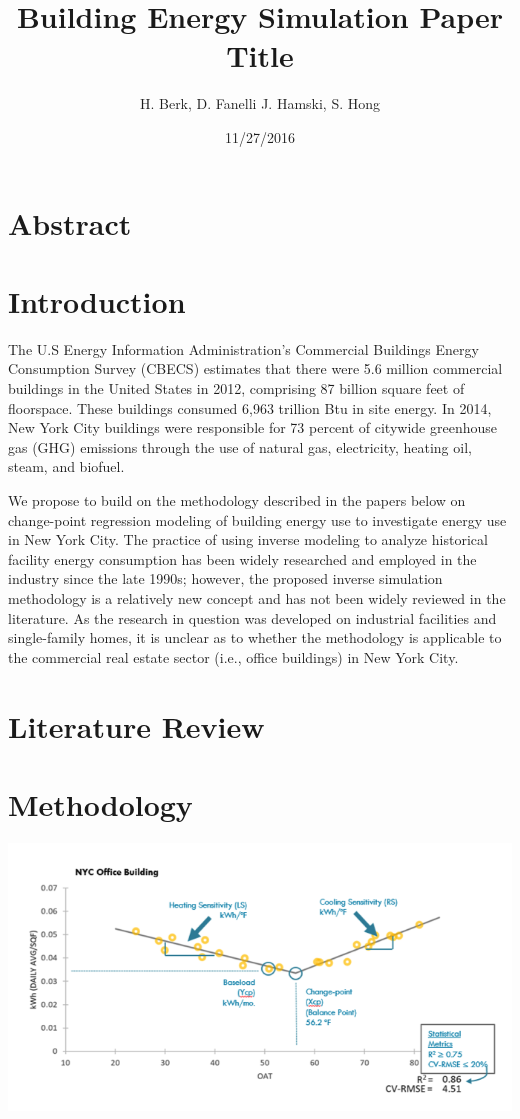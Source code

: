 \documentclass[]{article}
\title{Building Energy Simulation Paper Title}
\author{H. Berk, D. Fanelli J. Hamski, S. Hong}
\date{11/27/2016}
\begin{document}
\maketitle

\section{Abstract}\label{abstract}

\section{Introduction}\label{introduction}

The U.S Energy Information Administration's Commercial Buildings Energy
Consumption Survey (CBECS) estimates that there were 5.6 million
commercial buildings in the United States in 2012, comprising 87 billion
square feet of floorspace. These buildings consumed 6,963 trillion Btu
in site energy. In 2014, New York City buildings were responsible for 73
percent of citywide greenhouse gas (GHG) emissions through the use of
natural gas, electricity, heating oil, steam, and biofuel.

We propose to build on the methodology described in the papers below on
change-point regression modeling of building energy use to investigate
energy use in New York City. The practice of using inverse modeling to
analyze historical facility energy consumption has been widely
researched and employed in the industry since the late 1990s; however,
the proposed inverse simulation methodology is a relatively new concept
and has not been widely reviewed in the literature. As the research in
question was developed on industrial facilities and single-family homes,
it is unclear as to whether the methodology is applicable to the
commercial real estate sector (i.e., office buildings) in New York City.

\section{Literature Review}\label{literature-review}

\section{Methodology}\label{methodology}

\includegraphics{NYCOfficeBuilding.png}
\end{document}

